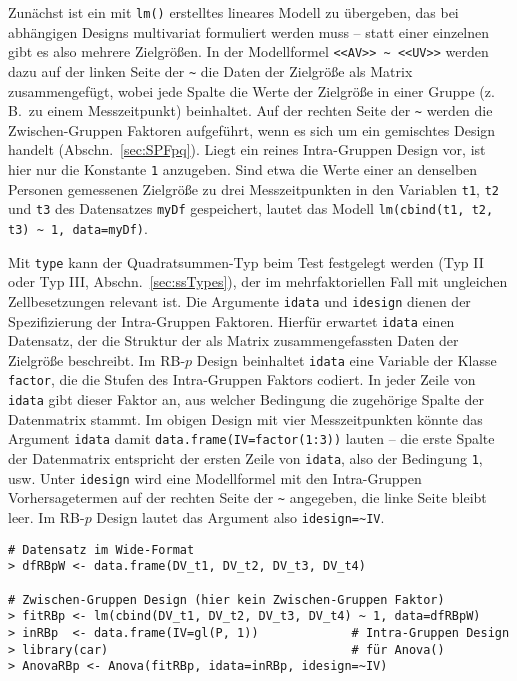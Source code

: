 Zunächst ist ein mit \lstinline!lm()! erstelltes lineares Modell zu übergeben, das bei abhängigen Designs multivariat formuliert werden muss -- statt einer einzelnen gibt es also mehrere Zielgrößen. In der Modellformel \lstinline!<<AV>> ~ <<UV>>! werden dazu auf der linken Seite der \lstinline!~! die Daten der Zielgröße als Matrix zusammengefügt, wobei jede Spalte die Werte der Zielgröße in einer Gruppe (z.\,B.\ zu einem Messzeitpunkt) beinhaltet. Auf der rechten Seite der \lstinline!~! werden die Zwischen-Gruppen Faktoren aufgeführt, wenn es sich um ein gemischtes Design handelt (Abschn.\ \ref{sec:SPFpq}). Liegt ein reines Intra-Gruppen Design vor, ist hier nur die Konstante \lstinline!1! anzugeben. Sind etwa die Werte einer an denselben Personen gemessenen Zielgröße zu drei Messzeitpunkten in den Variablen \lstinline!t1!, \lstinline!t2! und \lstinline!t3! des Datensatzes \lstinline!myDf! gespeichert, lautet das Modell \lstinline!lm(cbind(t1, t2, t3) ~ 1, data=myDf)!.

Mit \lstinline!type! kann der Quadratsummen-Typ beim Test festgelegt werden (Typ II oder Typ III, Abschn.\ \ref{sec:ssTypes}), der im mehrfaktoriellen Fall mit ungleichen Zellbesetzungen relevant ist. Die Argumente \lstinline!idata! und \lstinline!idesign! dienen der Spezifizierung der Intra-Gruppen Faktoren. Hierfür erwartet \lstinline!idata! einen Datensatz, der die Struktur der als Matrix zusammengefassten Daten der Zielgröße beschreibt. Im RB-$p$ Design beinhaltet \lstinline!idata! eine Variable der Klasse \lstinline!factor!, die die Stufen des Intra-Gruppen Faktors codiert. In jeder Zeile von \lstinline!idata! gibt dieser Faktor an, aus welcher Bedingung die zugehörige Spalte der Datenmatrix stammt. Im obigen Design mit vier Messzeitpunkten könnte das Argument \lstinline!idata! damit \lstinline!data.frame(IV=factor(1:3))! lauten -- die erste Spalte der Datenmatrix entspricht der ersten Zeile von \lstinline!idata!, also der Bedingung \lstinline!1!, usw. Unter \lstinline!idesign! wird eine Modellformel mit den Intra-Gruppen Vorhersagetermen auf der rechten Seite der \lstinline!~! angegeben, die linke Seite bleibt leer. Im RB-$p$ Design lautet das Argument also \lstinline!idesign=~IV!.
\begin{lstlisting}
# Datensatz im Wide-Format
> dfRBpW <- data.frame(DV_t1, DV_t2, DV_t3, DV_t4)

# Zwischen-Gruppen Design (hier kein Zwischen-Gruppen Faktor)
> fitRBp <- lm(cbind(DV_t1, DV_t2, DV_t3, DV_t4) ~ 1, data=dfRBpW)
> inRBp  <- data.frame(IV=gl(P, 1))             # Intra-Gruppen Design
> library(car)                                  # für Anova()
> AnovaRBp <- Anova(fitRBp, idata=inRBp, idesign=~IV)
\end{lstlisting}

